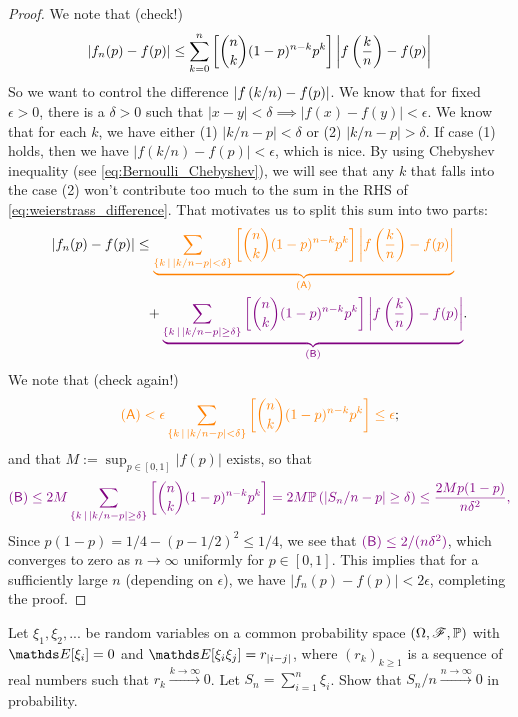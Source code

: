 \begin{proof} 
We note that (check!)
\begin{equation} \label{eq:weierstrass_difference}
    |f_n(p) - f(p)| \leq \sum_{k=0}^n \left[ {n\choose k} (1-p)^{n-k} p^k \right] \left| f\left( \frac{k}{n} \right) - f(p) \right|
\end{equation}
So we want to control the difference $\left| f\left( k/n \right) - f(p) \right|$. We know that for fixed $\epsilon > 0$, there is a $\delta > 0$ such that $|x-y|<\delta \implies |f(x)-f(y)| < \epsilon$. We know that for each $k$, we have either (1) $|k/n - p| < \delta$ or (2) $|k/n - p| > \delta$. If case (1) holds, then we have $|f(k/n) - f(p)| < \epsilon$, which is nice. By using Chebyshev inequality (see \eqref{eq:Bernoulli_Chebyshev}), we will see that any $k$ that falls into the case (2) won't contribute too much to the sum in the RHS of \eqref{eq:weierstrass_difference}. That motivates us to split this sum into two parts:
\begin{align*} \label{eq:weierstrass_difference}
    |f_n(p) - f(p)| &\leq \textcolor{orange}{\underbrace{\sum_{\left\{ k\,|\,|k/n-p|<\delta \right \}} \left[ {n\choose k} (1-p)^{n-k} p^k \right] \left| f\left( \frac{k}{n} \right) - f(p) \right|}_{\mathsf{(A)}}} \\
    &\phantom{=} + \textcolor{violet}{\underbrace{\sum_{\left\{ k\,|\,|k/n-p|\geq \delta \right \}} \left[ {n\choose k} (1-p)^{n-k} p^k \right] \left| f\left( \frac{k}{n} \right) - f(p) \right|}_{\mathsf{(B)}}}.
\end{align*}
We note that (check again!)
\begin{align*}
    \textcolor{orange}{\mathsf{(A)} < \epsilon \sum_{\left\{ k\,|\,|k/n-p|<\delta \right \}} \left[ {n\choose k} (1-p)^{n-k} p^k \right] \leq \epsilon};
\end{align*}
and that $M:= \sup_{p\in[0,1]}|f(p)|$ exists, so that
\begin{align*}
    \textcolor{violet}{\mathsf{(B)} \leq 2M\sum_{\left\{ k\,|\,|k/n-p|\geq\delta \right \}} \left[ {n\choose k} (1-p)^{n-k} p^k \right] = 2M\mathbb{P}\left( |S_n/n - p| \geq \delta \right)\leq \frac{2Mp(1-p)}{n\delta^2},}
\end{align*}
Since $p(1-p) = 1/4 - (p-1/2)^2 \leq 1/4$, we see that $ \textcolor{violet}{\mathsf{(B)} \leq 2/(n\delta^2)}$, which converges to zero as $n \to \infty$ uniformly for $p \in [0,1]$. This implies that for a sufficiently large $n$ (depending on $\epsilon$), we have $|f_n(p) - f(p)| < 2\epsilon$, completing the proof.
\end{proof}

\begin{exercise} Let $\xi_1, \xi_2, ...$ be random variables on a common probability space $(\Omega,\mathcal{F},\mathbb{P})$ with $\E[\xi_i] = 0$ and $\E[\xi_i \xi_j] = r_{|i-j|}$, where $(r_k)_{k\geq 1}$ is a sequence of real numbers such that $r_k \overset{k\to\infty}\to 0$. Let $S_n = \sum_{i=1}^n \xi_i$. Show that $S_n/n \overset{n\to\infty}\to 0$ in probability. 
\end{exercise}

